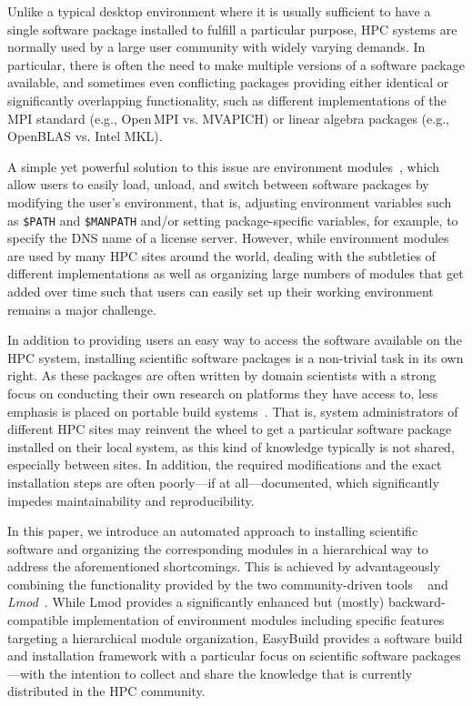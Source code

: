Unlike a typical desktop environment where it is usually sufficient to have a
single software package installed to fulfill a particular purpose, HPC
systems are normally used by a large user community with widely varying
demands. In particular, there is often the need to make multiple versions of
a software package available, and sometimes even conflicting packages
providing either identical or significantly overlapping functionality, such
as different implementations of the MPI standard (e.g., Open\,MPI vs.
MVAPICH) or linear algebra packages (e.g., OpenBLAS vs. Intel MKL).

A simple yet powerful solution to this issue are environment
modules~\cite{furlani91,furlani96,eadline,cmod,laytonEM1}, which allow
users to easily load, unload, and switch between software packages by
modifying the user's environment, that is, adjusting environment
variables such as \texttt{\$PATH} and \texttt{\$MANPATH} and/or setting
package-specific variables, for example, to specify the DNS name of a
license server. However, while environment modules are used by many
HPC sites around the world, dealing with the subtleties of different
implementations as well as organizing large numbers of modules that
get added over time such that users can easily set up their working environment
remains a major challenge.

In addition to providing users an easy way to access the software available
on the HPC system, installing scientific software packages is a non-trivial
task in its own right. As these packages are often written by domain
scientists with a strong focus on conducting their own research on platforms
they have access to, less emphasis is placed on portable build
systems~\cite{Dubois03}. That
is, system administrators of different HPC sites may reinvent the wheel to
get a particular software package installed on their local system, as this
kind of knowledge typically is not shared, especially between sites. In
addition, the required modifications and the exact installation steps are
often poorly---if at all---documented, which significantly impedes
maintainability and reproducibility.

In this paper, we introduce an automated approach to installing scientific
software and organizing the corresponding modules in a hierarchical way to
address the aforementioned shortcomings. This is achieved by advantageously
combining the functionality provided by the two community-driven tools
\emph{\easybuild{}}~\cite{EasyBuildSC12} and \emph{Lmod}~\cite{taccLmod}.
While Lmod provides a significantly enhanced but
(mostly) backward-compatible implementation of environment modules including specific
features targeting a hierarchical module organization, EasyBuild provides a
software build and installation framework with a particular focus on
scientific software packages---with the intention to collect and share the
knowledge that is currently distributed in the HPC community.

